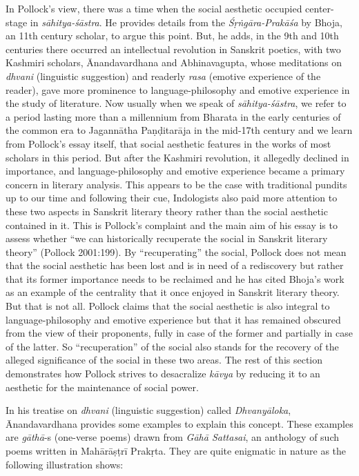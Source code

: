 In Pollock's view, there was a time when the social aesthetic occupied center-stage in \textsl{sāhitya-śāstra}. He provides details from the \textsl{Śṛṅgāra-Prakāśa} by Bhoja, an 11th century scholar, to argue this point. But, he adds, in the 9th and 10th centuries there occurred an intellectual revolution in Sanskrit poetics, with two Kashmiri scholars, Ānandavardhana and Abhinavagupta, whose meditations on \textsl{dhvani} (linguistic suggestion) and readerly \textsl{rasa} (emotive experience of the reader), gave more prominence to language-philosophy and emotive experience in the study of literature. Now usually when we speak of \textsl{sāhitya-śāstra}, we refer to a period lasting more than a millennium from Bharata in the early centuries of the common era to Jagannātha Paṇḍitarāja in the mid-17th century and we learn from Pollock's essay itself, that social aesthetic features in the works of most scholars in this period. But after the Kashmiri revolution, it allegedly declined in importance, and language-philosophy and emotive experience became a primary concern in literary analysis. This appears to be the case with traditional pundits up to our time and following their cue, Indologists also paid more attention to these two aspects in Sanskrit literary theory rather than the social aesthetic contained in it. This is Pollock's complaint and the main aim of his essay is to assess whether ``we can historically recuperate the social in Sanskrit literary theory'' (Pollock 2001:199). By ``recuperating'' the social, Pollock does not mean that the social aesthetic has been lost and is in need of a rediscovery but rather that its former importance needs to be reclaimed and he has cited Bhoja's work as an example of the centrality that it once enjoyed in Sanskrit literary theory. But that is not all. Pollock claims that the social aesthetic is also integral to language-philosophy and emotive experience but that it has remained obscured from the view of their proponents, fully in case of the former and partially in case of the latter. So ``recuperation'' of the social also stands for the recovery of the alleged significance of the social in these two areas. The rest of this section demonstrates how Pollock strives to desacralize \textsl{kāvya} by reducing it to an aesthetic for the maintenance of social power.

In his treatise on \textsl{dhvani} (linguistic suggestion) called \textsl{Dhvanyāloka}, Ānandavardhana provides some examples to explain this concept. These examples are \textsl{gāthā}-s (one-verse poems) drawn from \textsl{Gāhā Sattasai}, an anthology of such poems written in Mahārāṣṭrī Prakṛta. They are quite enigmatic in nature as the following illustration shows:

